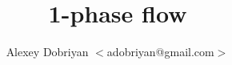 \documentclass{article}
\begin{document}
\title{1-phase flow}
\author{Alexey Dobriyan $<$adobriyan@gmail.com$>$}
\maketitle




\end{document}

